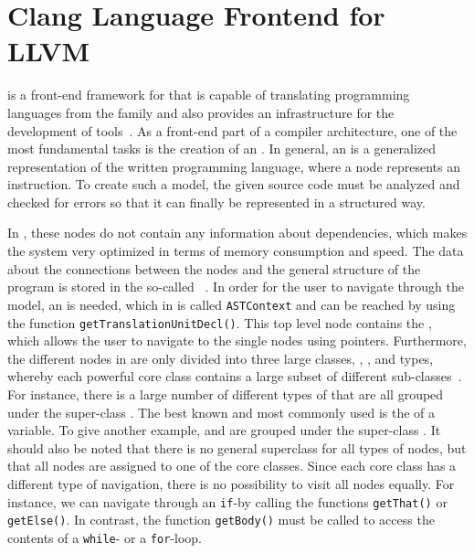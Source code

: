 \section{Clang Language Frontend for LLVM}
\CLANG is a front-end framework for \LLVM that is capable of translating programming languages from the \C family and also provides an infrastructure for the development of tools~\cite{ClangLanding}. As a front-end part of a compiler architecture, one of the most fundamental tasks is the creation of an \astsmall. In general, an \astsmall is a generalized representation of the written programming language, where a node represents an instruction. To create such a model, the given source code must be analyzed and checked for errors so that it can finally be represented in a structured way. 

In \CLANG, these nodes do not contain any information about dependencies, which makes the system very optimized in terms of memory consumption and speed. The data about the connections between the nodes and the general structure of the program is stored in the so-called \IDTAB~\cite{ClangASTVideo,ClangASTVideoNachweis}. In order for the user to navigate through the model, an \ENTPOI is needed, which in \CLANG is called \lstinline{ASTContext} and can be reached by using the function \lstinline{getTranslationUnitDecl()}. This top level node contains the \IDTAB, which allows the user to navigate to the single nodes using pointers. Furthermore, the different nodes in \CLANG are only divided into three large classes, \declssmall, \STATS, and types, whereby each powerful core class contains a large subset of different sub-classes~\cite{ClangAST}. For instance, there is a large number of different types of \declssmall that are all grouped under the super-class \declssmall. The best known and most commonly used is the \DECL of a variable. To give another example, \COMSTMTS and \BINOPT are grouped under the super-class \STATS. It should also be noted that there is no general superclass for all types of nodes, but that all nodes are assigned to one of the core classes. Since each core class has a different type of navigation, there is no possibility to visit all nodes equally. For instance, we can navigate through an \lstinline{if}-\STAT by calling the functions \lstinline{getThat()} or \lstinline{getElse()}. In contrast, the function \lstinline{getBody()} must be called to access the contents of a \lstinline{while}- or a \lstinline{for}-loop.

